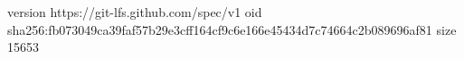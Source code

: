 version https://git-lfs.github.com/spec/v1
oid sha256:fb073049ca39faf57b29e3cff164cf9c6e166e45434d7c74664c2b089696af81
size 15653
